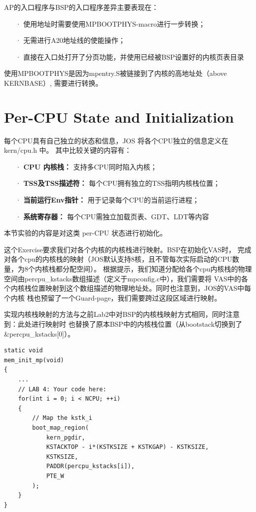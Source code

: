 \documentclass[12pt, letterpaper]{report}
\begin{document}
{\noindent AP的入口程序与BSP的入口程序差异主要表现在：}
\begin{itemize}
    \item[·]
    使用地址时需要使用MPBOOTPHYS-macro进行一步转换；
    \item[·]
    无需进行A20地址线的使能操作；
    \item[·]
    直接在入口处打开了分页功能，并使用已经被BSP设置好的内核页表目录
\end{itemize}
使用MPBOOTPHYS是因为mpentry.S被链接到了内核的高地址处（above KERNBASE）,
需要进行转换。

\section[\large Per-CPU State and Initialization]{Per-CPU State and Initialization}
每个CPU具有自己独立的状态和信息，JOS 将各个CPU独立的信息定义在 kern/cpu.h 中。
其中比较关键的内容有：
\begin{itemize}
    \item[·]\textbf{CPU 内核栈：}
    支持多CPU同时陷入内核；
    \item[·]\textbf{TSS及TSS描述符：}
    每个CPU拥有独立的TSS指明内核栈位置；
    \item[·]\textbf{当前运行Env指针：}
    用于记录每个CPU的当前运行进程；
    \item[·]\textbf{系统寄存器：}
    每个CPU需独立加载页表、GDT、LDT等内容
\end{itemize}
本节实验的内容是对这类 per-CPU 状态进行初始化。\par 

这个Exercise要求我们对各个内核的内核栈进行映射。BSP在初始化VAS时，
完成对各个cpu的内核栈的映射（JOS默认支持8核，且不管每次实际启动的CPU数量，为8个内核栈都分配空间）。
根据提示，我们知道分配给各个cpu内核栈的物理空间由percpu\_kstacks数组描述（定义于mpconfig.c中），我们需要将
VAS中的各个内核栈位置映射到这个数组描述的物理地址处。同时也注意到，JOS的VAS中每个内核
栈也预留了一个Guard-page，我们需要跨过这段区域进行映射。\par 
实现内核栈映射的方法与之前Lab2中对BSP的内核栈映射方式相同，同时注意到：此处进行映射时
也替换了原本BSP中的内核栈位置（从bootstack切换到了\&percpu\_kstacks[0]）。\par 
\lstset{style=CStyle}
\setmainfont{Consolas}
\begin{lstlisting}
static void
mem_init_mp(void)
{
    ...
    // LAB 4: Your code here:
    for(int i = 0; i < NCPU; ++i)
    {
        // Map the kstk_i
        boot_map_region(
            kern_pgdir, 
            KSTACKTOP - i*(KSTKSIZE + KSTKGAP) - KSTKSIZE,
            KSTKSIZE,
            PADDR(percpu_kstacks[i]),
            PTE_W 
        );    
    }
}
\end{lstlisting}
\setmainfont{Times New Roman}
\end{document}
